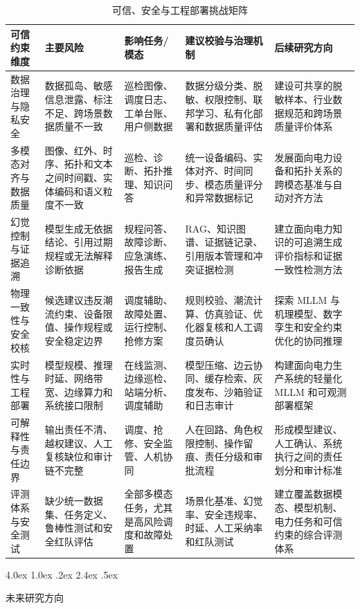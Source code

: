 \documentclass[10.5pt,compsoc]{CjC}
\makeatletter
\renewcommand\section{\@startsection {section}{1}{\z@}%
  {4.0ex \@plus 1.0ex \@minus .2ex}%
  {2.4ex \@plus .5ex}%
  {\normalfont\zihao{4-}\heiti\bfseries\raggedright}}
\theoremstyle{mystyle}
\makeatother
\begin{document}
\begin{table}[htbp]
\centering
\caption{可信、安全与工程部署挑战矩阵}
\label{tab:challenge}
\songti
\setlength{\tabcolsep}{3pt}
\renewcommand{\arraystretch}{1.16}
\begin{tabularx}{\textwidth}{p{} p{} p{} p{} X}
\toprule
可信约束维度 & 主要风险 & 影响任务/模态 & 建议校验与治理机制 & 后续研究方向 \\
\midrule
数据治理与隐私安全 & 数据孤岛、敏感信息泄露、标注不足、跨场景数据质量不一致 & 巡检图像、调度日志、工单台账、用户侧数据 & 数据分级分类、脱敏、权限控制、联邦学习、私有化部署和数据质量评估 & 建设可共享的脱敏样本、行业数据规范和跨场景质量评价体系 \\
多模态对齐与数据质量 & 图像、红外、时序、拓扑和文本之间时间戳、实体编码和语义粒度不一致 & 巡检、诊断、拓扑推理、知识问答 & 统一设备编码、实体对齐、时间同步、模态质量评分和异常数据标记 & 发展面向电力设备和拓扑关系的跨模态基准与自动对齐方法 \\
幻觉控制与证据追溯 & 模型生成无依据结论、引用过期规程或无法解释诊断依据 & 规程问答、故障诊断、应急演练、报告生成 & RAG、知识图谱、证据链记录、引用版本管理和冲突证据检测 & 建立面向电力知识的可追溯生成评价指标和证据一致性检测方法 \\
物理一致性与安全校核 & 候选建议违反潮流约束、设备限值、操作规程或安全稳定边界 & 调度辅助、故障处置、运行控制、抢修方案 & 规则校验、潮流计算、仿真验证、优化器复核和人工调度员确认 & 探索 MLLM 与机理模型、数字孪生和安全约束优化的协同推理 \\
实时性与工程部署 & 模型规模、推理时延、网络带宽、边缘算力和系统接口限制 & 在线监测、边缘巡检、站端分析、调度辅助 & 模型压缩、边云协同、缓存检索、灰度发布、沙箱验证和日志审计 & 构建面向电力生产系统的轻量化 MLLM 和可观测部署框架 \\
可解释性与责任边界 & 输出责任不清、越权建议、人工复核缺位和审计链不完整 & 调度、抢修、安全监管、人机协同 & 人在回路、角色权限控制、操作留痕、责任分级和审批流程 & 形成模型建议、人工确认、系统执行之间的责任划分和审计标准 \\
评测体系与安全测试 & 缺少统一数据集、任务定义、鲁棒性测试和安全红队评估 & 全部多模态任务，尤其是高风险调度和故障处置 & 场景化基准、幻觉率、安全违规率、时延、人工采纳率和红队测试 & 建立覆盖数据模态、模型机制、电力任务和可信约束的综合评测体系 \\
\bottomrule
\end{tabularx}
\end{table}


\section{未来研究方向}
\end{document}
